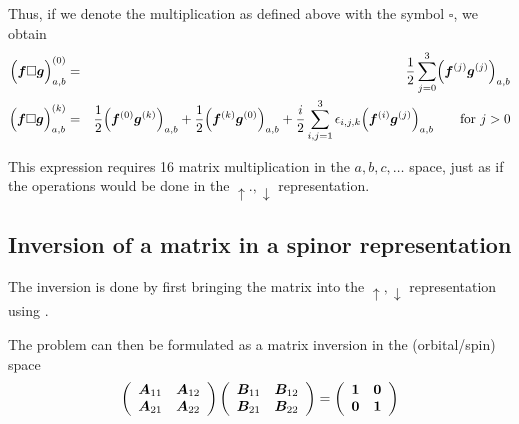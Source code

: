 \documentclass[11pt,a4paper]{report}
\begin{document}
Thus, if we denote the multiplication as defined above with the symbol
$\square$, we obtain
\begin{eqnarray}
\Bigl(\bm{f}\square\bm{g}\Bigr)^{(0)}_{a,b}
&=&\frac{1}{2}\sum_{j=0}^3\Bigl(\bm{f}^{(j)}\bm{g}^{(j)}\Bigr)_{a,b}
\\
\Bigl(\bm{f}\square\bm{g}\Bigr)^{(k)}_{a,b}
&=&\frac{1}{2}
\Bigl(\bm{f}^{(0)}\bm{g}^{(k)}\Bigr)_{a,b}
+\frac{1}{2}\Bigl(\bm{f}^{(k)}\bm{g}^{(0)}\Bigr)_{a,b}
+\frac{i}{2}\sum_{i,j=1}^3\epsilon_{i,j,k}
\Bigl(\bm{f}^{(i)}\bm{g}^{(j)}\Bigr)_{a,b}
\qquad\text{for $j>0$}
\end{eqnarray}

This expression requires 16 matrix multiplication in the
$a,b,c,\ldots$ space, just as if the operations would be done in the
$\uparrow.,\downarrow$ representation.

\subsection{Inversion of a matrix in a spinor representation}
The inversion is done by first bringing the matrix into the
$\uparrow,\downarrow$ representation
using .

The problem can then be formulated as a matrix inversion in the
(orbital/spin) space
\begin{eqnarray}
\left(\begin{array}{cc}
\bm{A}_{11}&\bm{A}_{12}\\\bm{A}_{21}&\bm{A}_{22}
\end{array}\right)
\left(\begin{array}{cc}
\bm{B}_{11}&\bm{B}_{12}\\\bm{B}_{21}&\bm{B}_{22}
\end{array}\right)
=
\left(\begin{array}{cc}
\bm{1}&\bm{0}\\\bm{0}&\bm{1}
\end{array}\right)
\end{eqnarray}
\end{document}

